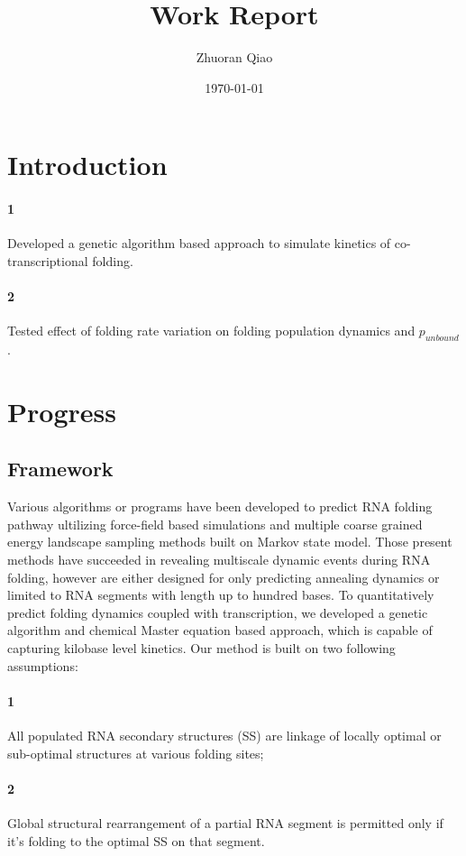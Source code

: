 \documentclass[11pt, a4paper]{article}
\begin{document}
\title{Work Report}
\author{Zhuoran Qiao}
\date{\today}

\maketitle

\section{Introduction}

\paragraph{1} Developed a genetic algorithm based approach to simulate kinetics of co-transcriptional folding.
\paragraph{2} Tested effect of folding rate variation on folding population dynamics and $p_{unbound}$.


\section{Progress}
\subsection{Framework}
Various algorithms or programs have been developed to predict RNA folding pathway ultilizing force-field based simulations and multiple coarse grained energy landscape sampling methods built on Markov state model. Those present methods have succeeded in revealing multiscale dynamic events during RNA folding, however are either designed for only predicting
annealing dynamics or limited to RNA segments with length up to hundred bases. To quantitatively predict folding dynamics coupled with transcription,
we developed a genetic algorithm and chemical Master equation based approach, which is capable of capturing kilobase level kinetics.
 Our method is built on two following assumptions:
\paragraph{1} All populated RNA secondary structures (SS) are linkage of locally optimal or sub-optimal structures at various folding sites;
\paragraph{2} Global structural rearrangement of a partial RNA segment is permitted only if it's folding to the optimal SS on that segment.
\\
\end{document}
